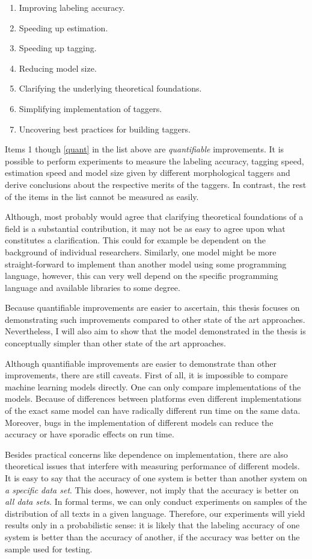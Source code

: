 \begin{enumerate}
\item Improving labeling accuracy.
\item Speeding up estimation.
\item Speeding up tagging.
\item Reducing model size. \label{quant}
\item Clarifying the underlying theoretical foundations.
\item Simplifying implementation of taggers.
\item Uncovering best practices for building taggers.
\end{enumerate}

Items 1 though \ref{quant} in the list above are {\it quantifiable}
improvements. It is possible to perform experiments to measure the
labeling accuracy, tagging speed, estimation speed and model size
given by different morphological taggers and derive conclusions about
the respective merits of the taggers. In contrast, the rest of the
items in the list cannot be measured as easily. 

Although, most probably would agree that clarifying theoretical
foundations of a field is a substantial contribution, it may not be as
easy to agree upon what constitutes a clarification. This could for
example be dependent on the background of individual
researchers. Similarly, one model might be more straight-forward to
implement than another model using some programming language, however,
this can very well depend on the specific programming language and
available libraries to some degree.

Because quantifiable improvements are easier to ascertain, this thesis
focuses on demonstrating such improvements compared to other state of
the art approaches. Nevertheless, I will also aim to show that the
model demonstrated in the thesis is conceptually simpler than other
state of the art approaches.

Although quantifiable improvements are easier to demonstrate than
other improvements, there are still caveats. First of all, it is
impossible to compare machine learning models directly. One can only
compare implementations of the models. Because of differences between
platforms even different implementations of the exact same model can
have radically different run time on the same data. Moreover, bugs in
the implementation of different models can reduce the accuracy or have
sporadic effects on run time.

Besides practical concerns like dependence on implementation, there
are also theoretical issues that interfere with measuring performance
of different models. It is easy to say that the accuracy of one system
is better than another system on {\it a specific data set}. This does,
however, not imply that the accuracy is better on {\it all data
  sets}. In formal terms, we can only conduct experiments on samples
of the distribution of all texts in a given language. Therefore, our
experiments will yield results only in a probabilistic sense: it is
likely that the labeling accuracy of one system is better than the
accuracy of another, if the accuracy was better on the sample used for
testing.
 
